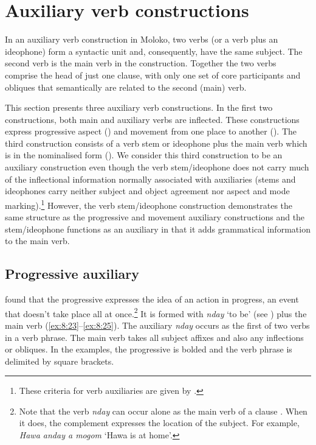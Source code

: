 \section{Auxiliary verb constructions}\label{sec:8.2}
\hypertarget{RefHeading1212541525720847}{}
In an auxiliary verb construction in Moloko, two verbs (or a verb plus an ideophone) form a syntactic unit and, consequently, have the same subject. The second verb is the main verb in the construction. Together the two verbs comprise the head of just one clause, with only one set of core participants and obliques that semantically are related to the second (main) verb. 

This section presents three auxiliary verb constructions. In the first two constructions, both main and auxiliary verbs are inflected.  These constructions express progressive aspect () and movement from one place to another ().  The third construction consists of a verb stem or ideophone plus the main verb which is in the nominalised form (). We consider this third construction to be an auxiliary construction even though the verb stem/ideophone does not carry much of the inflectional information normally associated with auxiliaries (stems and ideophones carry neither subject and object agreement nor aspect and mode marking).\footnote{These criteria for verb auxiliaries are given by \citet[84]{Payne1997}.} However, the verb stem/ideophone construction demonstrates the same structure as the progressive and movement auxiliary constructions and the stem/ideophone functions as an auxiliary in that it adds grammatical information to the main verb.  

\subsection{Progressive auxiliary}\label{sec:8.2.1}
\hypertarget{RefHeading1212561525720847}{}
\largerpage[2] \citet{FriesenMamalis2008} found that the progressive expresses the idea of an action in progress, an event that doesn’t take place all at once.\footnote{Note that the verb \textit{nday}  can occur alone as the main verb of a clause . When it does, the complement expresses the location of the subject. For example, \textit{Hawa anday a mogom} ‘Hawa is at home’.}  It is formed with \textit{nday} ‘to be’ (see ) plus the main verb (\ref{ex:8:23}--\ref{ex:8:25}).  The auxiliary \textit{nday} occurs as the first of two verbs in a verb phrase. The main verb takes all subject affixes and also any inflections or obliques. In the examples, the progressive is bolded and the verb phrase is delimited by square brackets.

